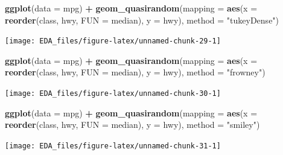 \documentclass[]{book}
\newenvironment{Shaded}{\begin{snugshade}}{\end{snugshade}}
\newcommand{\DataTypeTok}[1]{\textcolor[rgb]{0.13,0.29,0.53}{#1}}
\newcommand{\KeywordTok}[1]{\textcolor[rgb]{0.13,0.29,0.53}{\textbf{#1}}}
\newcommand{\NormalTok}[1]{#1}
\newcommand{\OperatorTok}[1]{\textcolor[rgb]{0.81,0.36,0.00}{\textbf{#1}}}
\newcommand{\StringTok}[1]{\textcolor[rgb]{0.31,0.60,0.02}{#1}}
\theoremstyle{plain}
\theoremstyle{remark}
\begin{document}
\begin{Shaded}
\begin{Highlighting}[]
\KeywordTok{ggplot}\NormalTok{(}\DataTypeTok{data =}\NormalTok{ mpg) }\OperatorTok{+}
\StringTok{  }\KeywordTok{geom_quasirandom}\NormalTok{(}\DataTypeTok{mapping =} \KeywordTok{aes}\NormalTok{(}\DataTypeTok{x =} \KeywordTok{reorder}\NormalTok{(class, hwy, }\DataTypeTok{FUN =}\NormalTok{ median),}
                                 \DataTypeTok{y =}\NormalTok{ hwy),}
                   \DataTypeTok{method =} \StringTok{"tukeyDense"}\NormalTok{)}
\end{Highlighting}
\end{Shaded}

\begin{center}\texttt{[image: EDA\_files/figure-latex/unnamed-chunk-29-1]} \end{center}

\begin{Shaded}
\begin{Highlighting}[]
\KeywordTok{ggplot}\NormalTok{(}\DataTypeTok{data =}\NormalTok{ mpg) }\OperatorTok{+}
\StringTok{  }\KeywordTok{geom_quasirandom}\NormalTok{(}\DataTypeTok{mapping =} \KeywordTok{aes}\NormalTok{(}\DataTypeTok{x =} \KeywordTok{reorder}\NormalTok{(class, hwy, }\DataTypeTok{FUN =}\NormalTok{ median),}
                                 \DataTypeTok{y =}\NormalTok{ hwy),}
                   \DataTypeTok{method =} \StringTok{"frowney"}\NormalTok{)}
\end{Highlighting}
\end{Shaded}

\begin{center}\texttt{[image: EDA\_files/figure-latex/unnamed-chunk-30-1]} \end{center}

\begin{Shaded}
\begin{Highlighting}[]
\KeywordTok{ggplot}\NormalTok{(}\DataTypeTok{data =}\NormalTok{ mpg) }\OperatorTok{+}
\StringTok{  }\KeywordTok{geom_quasirandom}\NormalTok{(}\DataTypeTok{mapping =} \KeywordTok{aes}\NormalTok{(}\DataTypeTok{x =} \KeywordTok{reorder}\NormalTok{(class, hwy, }\DataTypeTok{FUN =}\NormalTok{ median),}
                                 \DataTypeTok{y =}\NormalTok{ hwy),}
                   \DataTypeTok{method =} \StringTok{"smiley"}\NormalTok{)}
\end{Highlighting}
\end{Shaded}

\begin{center}\texttt{[image: EDA\_files/figure-latex/unnamed-chunk-31-1]} \end{center}
\end{document}
